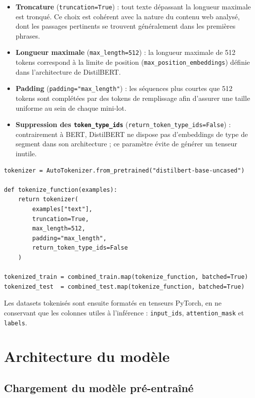 ﻿\documentclass[12pt, a4paper]{report}
\begin{document}
\begin{itemize}
  \item \textbf{Troncature} (\texttt{truncation=True}) : tout texte dépassant
        la longueur maximale est tronqué. Ce choix est cohérent avec la
        nature du contenu web analysé, dont les passages pertinents se
        trouvent généralement dans les premières phrases.
  \item \textbf{Longueur maximale} (\texttt{max\_length=512}) : la longueur
        maximale de 512 tokens correspond à la limite de position
        (\texttt{max\_position\_embeddings}) définie dans l'architecture de
        DistilBERT.
  \item \textbf{Padding} (\texttt{padding="max\_length"}) : les séquences
        plus courtes que 512 tokens sont complétées par des tokens de
        remplissage afin d'assurer une taille uniforme au sein de chaque
        mini-lot.
  \item \textbf{Suppression des \texttt{token\_type\_ids}}
        (\texttt{return\_token\_type\_ids=False}) : contrairement à
        BERT, DistilBERT ne dispose pas d'embeddings de type de segment
        dans son architecture ; ce paramètre évite de générer un tenseur
        inutile.
\end{itemize}

\begin{verbatim}
tokenizer = AutoTokenizer.from_pretrained("distilbert-base-uncased")

def tokenize_function(examples):
    return tokenizer(
        examples["text"],
        truncation=True,
        max_length=512,
        padding="max_length",
        return_token_type_ids=False
    )

tokenized_train = combined_train.map(tokenize_function, batched=True)
tokenized_test  = combined_test.map(tokenize_function, batched=True)
\end{verbatim}

Les datasets tokenisés sont ensuite formatés en tenseurs PyTorch, en ne
conservant que les colonnes utiles à l'inférence :
\texttt{input\_ids}, \texttt{attention\_mask} et \texttt{labels}.

\section{Architecture du modèle}

\subsection{Chargement du modèle pré-entraîné}
\end{document}
